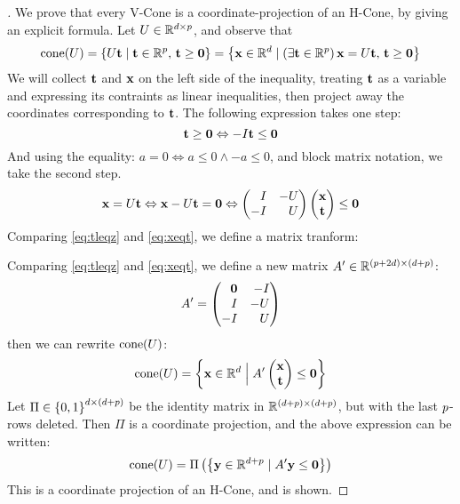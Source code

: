 \begin{proof}[]
	We prove that every V-Cone is a coordinate-projection of an H-Cone, by giving an explicit formula.  Let ${U \in \mathbb{R}^{d\times p}}$, and observe that
	\[ \operatorname{cone}(U) = \left\{U\mathbf{t} \;|\; \mathbf{t} \in \mathbb{R}^{p},\, \mathbf{t} \geq \mathbf{0}\right\} =
		\left\{\mathbf{x} \in \mathbb{R}^d \;|\; (\exists \mathbf{t} \in \mathbb{R}^{p})\,\mathbf{x} = U\mathbf{t},\, \mathbf{t} \geq \mathbf{0}\right\} \]
	We will collect $\mathbf{t}$ and $\mathbf{x}$ on the left side of the inequality, treating $\mathbf{t}$ as a variable and expressing its contraints as linear inequalities, then project away the coordinates corresponding to $\mathbf{t}$.  The following expression takes one step:
	\begin{equation}\label{eq:tleqz}
		\mathbf{t} \geq \mathbf{0} \Leftrightarrow -I\mathbf{t} \leq \mathbf{0}
	\end{equation}
	And using the equality: $a = 0 \Leftrightarrow a \leq 0 \land -a \leq 0$, and block matrix notation, we take the second step.
	\begin{equation}\label{eq:xeqt}
		\x = U\t \Leftrightarrow \x - U\t = \0 \Leftrightarrow
		\begin{pmatrix*}[r] I & -U \\ -I & U \end{pmatrix*} \xt \leq \0
	\end{equation}
	Comparing \eqref{eq:tleqz} and \eqref{eq:xeqt}, we define a matrix tranform:
  \begin{Transform}\label{vconelift_transform}
  \end{Transform}
	Comparing \eqref{eq:tleqz} and \eqref{eq:xeqt}, we define a new matrix $A' \in \mathbb{R}^{(p+2d)\times(d+p)}$:
	\begin{equation}\label{eq:Alift}
		A' = \begin{pmatrix*}[r] \0 & -I \\ I & -U \\ -I & U \end{pmatrix*}
	\end{equation}
	then we can rewrite $\operatorname{cone}(U)$:
	\begin{equation*}
		\cone(U) = \set{ \xv \St A'\xt \leq \0}
	\end{equation*}
	Let $\Pi \in \left\{0,1\right\}^{d\times(d+p)}$ be the identity matrix in $\mathbb{R}^{(d+p)\times(d+p)}$, but with the last $p$-rows deleted.  Then $\Pi$ is a coordinate projection, and the above expression can be written:
	\begin{equation}\label{eq:vconelift}
		\operatorname{cone}(U) = \Pi\left(\left\{ \mathbf{y} \in \mathbb{R}^{d+p} \;|\; A'\mathbf{y} \leq \mathbf{0}\right\}\right)
	\end{equation}
	This is a coordinate projection of an H-Cone, and  is shown.
\end{proof}

